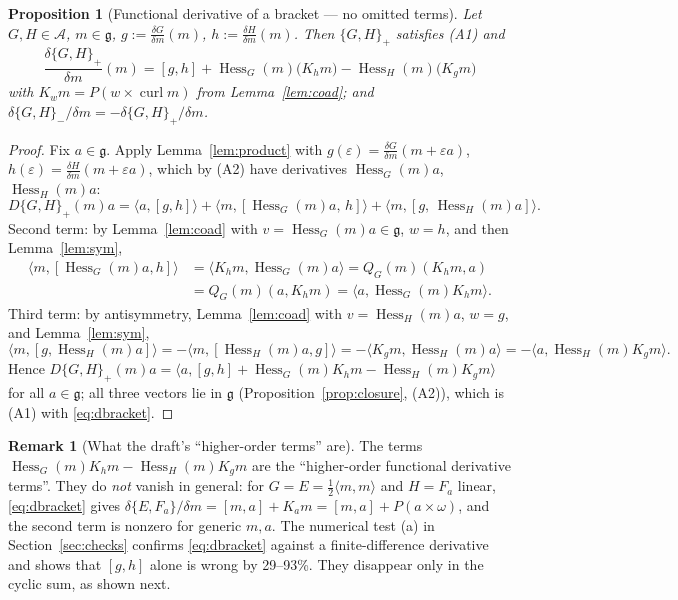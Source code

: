 \documentclass[11pt]{article}
\newtheorem{proposition}[theorem]{Proposition}
\theoremstyle{definition}
\newtheorem{remark}[theorem]{Remark}
\newcommand{\g}{\mathfrak{g}}
\newcommand{\ip}[2]{\langle #1,#2\rangle}
\newcommand{\curl}{\operatorname{curl}}
\newcommand{\Hess}{\operatorname{Hess}}
\newcommand{\dF}[1]{\frac{\delta #1}{\delta m}}
\begin{document}
\begin{proposition}[Functional derivative of a bracket --- no omitted terms]\label{prop:dbracket}
Let $G,H\in\mathcal A$, $m\in\g$, $g:=\dF G(m)$, $h:=\dF H(m)$. Then $\{G,H\}_+$ satisfies (A1) and
\begin{equation}\label{eq:dbracket}
\boxed{\ \frac{\delta\{G,H\}_+}{\delta m}(m)=[g,h]+\Hess_G(m)\big(K_hm\big)-\Hess_H(m)\big(K_gm\big)\ }
\end{equation}
with $K_wm=P(w\times\curl m)$ from Lemma~\ref{lem:coad}; and $\delta\{G,H\}_-/\delta m=-\delta\{G,H\}_+/\delta m$.
\end{proposition}
\begin{proof}
Fix $a\in\g$. Apply Lemma~\ref{lem:product} with $g(\varepsilon)=\dF G(m+\varepsilon a)$,
$h(\varepsilon)=\dF H(m+\varepsilon a)$, which by (A2) have derivatives $\Hess_G(m)a$, $\Hess_H(m)a$:
\begin{equation}\label{eq:threeterms}
D\{G,H\}_+(m)a=\ip a{[g,h]}+\ip m{[\Hess_G(m)a,\,h]}+\ip m{[g,\,\Hess_H(m)a]}.
\end{equation}
Second term: by Lemma~\ref{lem:coad} with $v=\Hess_G(m)a\in\g$, $w=h$, and then Lemma~\ref{lem:sym},
\begin{align*}
\ip m{[\Hess_G(m)a,h]}&=\ip{K_hm}{\Hess_G(m)a}=Q_G(m)(K_hm,a)\\
&=Q_G(m)(a,K_hm)=\ip a{\Hess_G(m)K_hm}.
\end{align*}
Third term: by antisymmetry, Lemma~\ref{lem:coad} with $v=\Hess_H(m)a$, $w=g$, and Lemma~\ref{lem:sym},
\[
\ip m{[g,\Hess_H(m)a]}=-\ip m{[\Hess_H(m)a,g]}=-\ip{K_gm}{\Hess_H(m)a}=-\ip a{\Hess_H(m)K_gm}.
\]
Hence $D\{G,H\}_+(m)a=\ip a{[g,h]+\Hess_G(m)K_hm-\Hess_H(m)K_gm}$ for all $a\in\g$; all three
vectors lie in $\g$ (Proposition~\ref{prop:closure}, (A2)), which is (A1) with \eqref{eq:dbracket}.
\end{proof}

\begin{remark}[What the draft's ``higher-order terms'' are]
The terms $\Hess_G(m)K_hm-\Hess_H(m)K_gm$ are the ``higher-order functional derivative terms''.
They do \emph{not} vanish in general: for $G=E=\frac12\ip mm$ and $H=F_a$ linear, \eqref{eq:dbracket}
gives $\delta\{E,F_a\}/\delta m=[m,a]+K_am=[m,a]+P(a\times\omega)$, and the second term is nonzero for
generic $m,a$. The numerical test (a) in Section~\ref{sec:checks} confirms \eqref{eq:dbracket} against
a finite-difference derivative and shows that $[g,h]$ alone is wrong by 29--93\%. They disappear only
in the cyclic sum, as shown next.
\end{remark}
\end{document}
